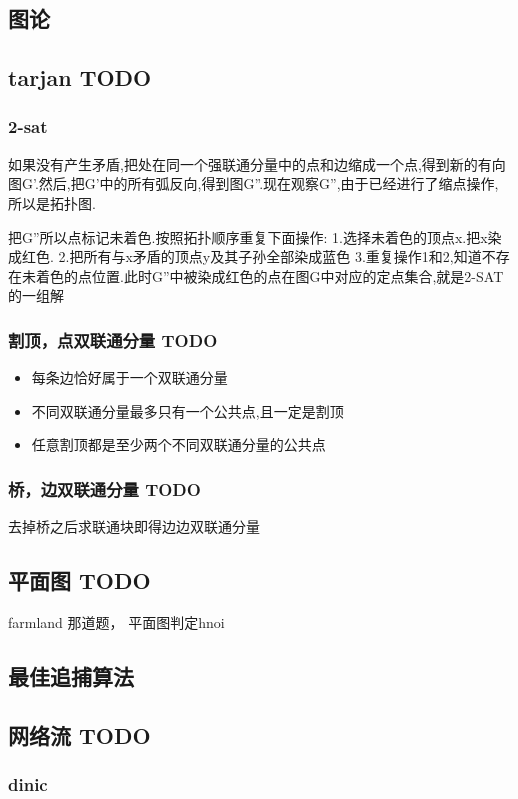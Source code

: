 \documentclass[landscape]{report}
\newcommand{\includecode}[2][c]{}
\begin{document}
\begin{flushleft}
\begin{multicols}{2}
\includecode[c++]{cash.cpp}




\chapter{ 图论}
\section{ tarjan  TODO}
\subsection{ 2-sat}
如果没有产生矛盾,把处在同一个强联通分量中的点和边缩成一个点,得到新的有向图G'.然后,把G'中的所有弧反向,得到图G''.现在观察G'',由于已经进行了缩点操作,所以是拓扑图.

把G''所以点标记未着色.按照拓扑顺序重复下面操作:
1.选择未着色的顶点x.把x染成红色.
2.把所有与x矛盾的顶点y及其子孙全部染成蓝色
3.重复操作1和2,知道不存在未着色的点位置.此时G''中被染成红色的点在图G中对应的定点集合,就是2-SAT的一组解

\includecode[c++]{cf568C.cpp}
\subsection{ 割顶，点双联通分量 TODO}
\begin{itemize}
\item 每条边恰好属于一个双联通分量
\item 不同双联通分量最多只有一个公共点,且一定是割顶
\item 任意割顶都是至少两个不同双联通分量的公共点
\end{itemize}
\subsection{ 桥，边双联通分量 TODO}
去掉桥之后求联通块即得边边双联通分量


\section{ 平面图 TODO}
farmland 那道题， 平面图判定hnoi
\section{ 最佳追捕算法}
\section{网络流 TODO}
\subsection{ dinic}

\end{multicols}
\end{flushleft}
\end{document}
